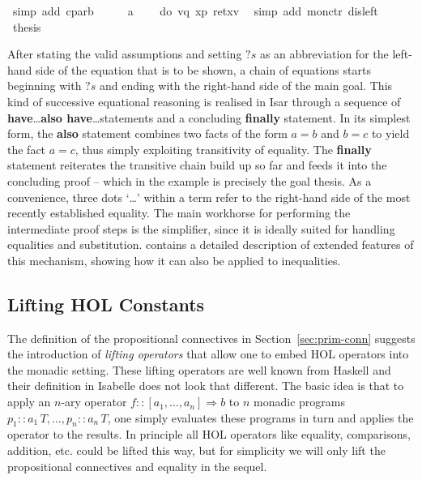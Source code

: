\begin{isabellebody}
\ {\isacharparenleft}simp\ add{\isacharcolon}\ cp{\isacharunderscore}arb{\isacharparenright}\isanewline
\ \ \isamarkupfalse%
\ \isamarkupfalse%
\ a\ \isamarkupfalse%
\ {\isachardoublequote}{\isasymdots}\ {\isacharequal}\ do\ {\isacharbraceleft}v{\isasymleftarrow}q{\isacharsemicolon}\ x{\isasymleftarrow}p{\isacharsemicolon}\ ret{\isacharparenleft}x{\isacharcomma}v{\isacharparenright}{\isacharbraceright}{\isachardoublequote}\ \isamarkupfalse%
\ {\isacharparenleft}simp\ add{\isacharcolon}\ mon{\isacharunderscore}ctr\ dis{\isacharunderscore}left{}{\isacharparenright}\isanewline
\ \ \isamarkupfalse%
\ \isamarkupfalse%
\ {\isacharquery}thesis\ \isamarkupfalse%
\isacommand{{\isachardot}}\isanewline
\isamarkupfalse%
\isamarkupfalse%
\isanewline
\end{isabellebody}

\noindent After stating the valid assumptions and setting $?s$ as an
abbreviation for the left-hand side of the equation that is to be shown, a chain
of equations starts beginning with $?s$ and ending with the right-hand side of
the main goal. This kind of successive equational reasoning is realised in Isar
through a sequence of \textbf{have}\ldots \textbf{also have}\ldots statements and a
concluding \textbf{finally} statement. In its simplest form, the \textbf{also}
statement combines two facts of the form $a = b$ and $b = c$ to yield the fact
$a = c$, thus simply exploiting transitivity of equality. The \textbf{finally}
statement reiterates the transitive chain build up so far and feeds it into the
concluding proof -- which in the example is precisely the goal thesis. As a
convenience, three dots `\ldots' within a term refer to the right-hand side of the
most recently established equality. The main workhorse for performing the
intermediate proof steps is the simplifier, since it is ideally suited for
handling equalities and substitution. \cite{BauerWenzel01} contains a detailed
description of extended features of this mechanism, showing how it can also be
applied to  inequalities.


\subsection{Lifting HOL Constants}
\label{sec:lift-hol-const}


The definition of the propositional connectives in Section~\ref{sec:prim-conn}
suggests the introduction of \emph{lifting operators} that allow one to embed
HOL operators into the monadic setting. These lifting operators are well known
from Haskell and their definition in Isabelle does not look that different. The
basic idea is that to apply an $n$-ary operator $f :: [a_1,\ldots,a_n]
\Rightarrow b$ to $n$ monadic programs $p_1 :: a_1\,T, \ldots,  p_n::a_n\,T$, one
simply evaluates these programs in turn and applies the operator to the results.
In principle all HOL operators like equality, comparisons, addition, etc. could
be lifted this way, but for simplicity we will only lift the propositional
connectives and equality in the sequel.

